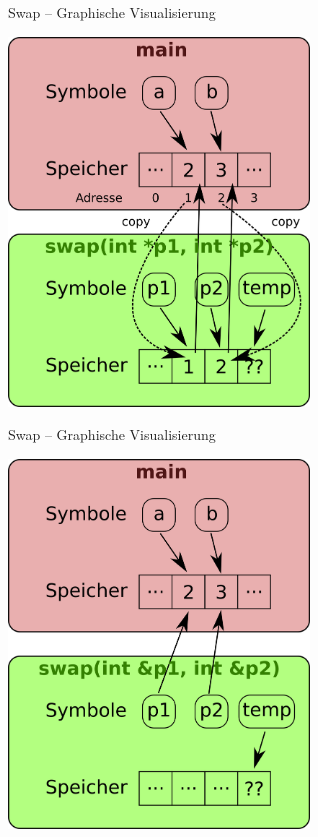 \documentclass[presentation]{beamer}
\begin{document}
\begin{frame}[label={sec:orgb13e4b4}]{Swap -- Graphische Visualisierung}
\begin{center}\begin{center}
\includegraphics[width=0.6\textwidth]{img/swap_point.png}
\end{center}\end{center}
\end{frame}
\begin{frame}[label={sec:orgb22f3c5}]{Swap -- Graphische Visualisierung}
\begin{center}\begin{center}
\includegraphics[width=0.6\textwidth]{img/swap_ref.png}
\end{center}\end{center}
\end{frame}
\end{document}

